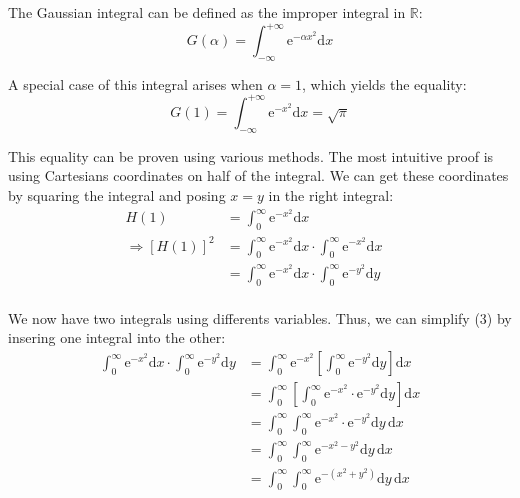 \documentclass[11pt]{article}
\begin{document}

The Gaussian integral can be defined as the improper integral in $\mathbb{R}$:
\begin{equation}
G(\alpha)=\int_{-\infty}^{+\infty}\mathrm e^{-\alpha x^2}\mathrm dx
\end{equation}

A special case of this integral arises when $\alpha = 1$, which yields the equality:
\begin{equation}
G(1)=\int_{-\infty}^{+\infty}\mathrm e^{-x^2}\mathrm dx = \sqrt{\pi}
\end{equation}

This equality can be proven using various methods. The most intuitive proof is using Cartesians coordinates on half of the integral. We can get these coordinates by squaring the integral and posing $x = y$ in the right integral:
\begin{equation}
\begin{split}
                   H(1)           &= \int_{0}^{\infty}\mathrm e^{-x^2}\mathrm dx\\
\Rightarrow \left [H(1)\right ]^2 &= \int_{0}^{\infty}\mathrm e^{-x^2}\mathrm dx\cdot 
                                     \int_{0}^{\infty}\mathrm e^{-x^2}\mathrm dx\\
                                  &= \int_{0}^{\infty}\mathrm e^{-x^2}\mathrm dx\cdot
                                     \int_{0}^{\infty}\mathrm e^{-y^2}\mathrm dy\quad\\
\end{split}
\end{equation}

We now have two integrals using differents variables. Thus, we can simplify (3) by insering one integral into the other:
\begin{equation}
\begin{split}
\int_{0}^{\infty}\mathrm e^{-x^2}\mathrm dx\cdot
\int_{0}^{\infty}\mathrm e^{-y^2}\mathrm dy
&= \int_{0}^{\infty}\mathrm e^{-x^2}\left [
   \int_{0}^{\infty}\mathrm e^{-y^2}\mathrm dy\right ]\mathrm dx\\
&= \int_{0}^{\infty}\left [\int_{0}^{\infty}
   \mathrm e^{-x^2}\cdot \mathrm e^{-y^2}\mathrm dy\right ]\mathrm dx\\
&= \int_{0}^{\infty}\int_{0}^{\infty}
   \mathrm e^{-x^2}\cdot \mathrm e^{-y^2}\mathrm dy\,\mathrm dx\\
&= \int_{0}^{\infty}\int_{0}^{\infty}
   \mathrm e^{-x^2-y^2}\mathrm dy\,\mathrm dx\\
&= \int_{0}^{\infty}\int_{0}^{\infty}
   \mathrm e^{-(x^2+y^2)}\mathrm dy\,\mathrm dx\\
\end{split}
\end{equation}
\end{document}
